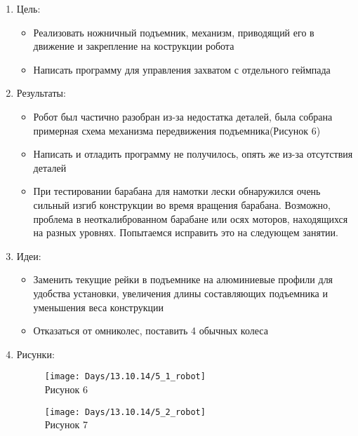 
	\begin{enumerate}
		\item Цель:
		\begin{itemize}
			\item Реализовать ножничный подъемник, механизм, приводящий его в движение и закрепление на кострукции робота
			\item Написать программу для управления захватом с отдельного геймпада
		\end{itemize}
		\item Результаты:
		\begin{itemize}
			\item Робот был частично разобран из-за недостатка деталей, была собрана примерная схема механизма передвижения подъемника(Рисунок 6)
			\item Написать и отладить программу не получилось, опять же из-за отсутствия деталей
			\item При тестировании барабана для намотки лески обнаружился очень сильный изгиб конструкции во время вращения барабана. Возможно, проблема в неоткалиброванном барабане или осях моторов, находящихся на разных уровнях. Попытаемся исправить это на следующем занятии.
		\end{itemize}
		\item Идеи:
		\begin{itemize}
			\item Заменить текущие рейки в подъемнике на алюминиевые профили для удобства установки, увеличения длины составляющих подъемника и уменьшения веса конструкции
			\item Отказаться от омниколес, поставить 4 обычных колеса
		\end{itemize}
		\item Рисунки:
		\begin{figure} [h]
			\centering
			\begin{minipage}{0.3\linewidth}
				\texttt{[image: Days/13.10.14/5\_1\_robot]}\\ Рисунок 6
			\end{minipage}
			\begin{minipage}{0.3\linewidth}
				\texttt{[image: Days/13.10.14/5\_2\_robot]}\\ Рисунок 7
			\end{minipage}
		\end{figure}
	\end{enumerate}
	\clearpage
